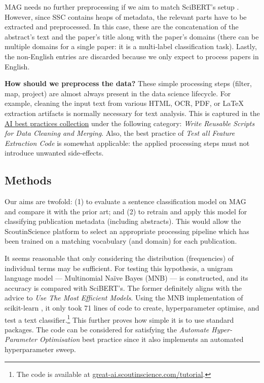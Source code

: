 MAG needs no further preprocessing if we aim to match SciBERT's setup \cite{beltagy2019scibert}. However, since SSC contains heaps of metadata, the relevant parts have to be extracted and preprocessed. In this case, these are the concatenation of the abstract's text and the paper's title along with the paper's domains (there can be multiple domains for a single paper: it is a multi-label classification task). Lastly, the non-English entries are discarded because we only expect to process papers in English.

\begin{displayquote}
\textbf{How should we preprocess the data?} These simple processing steps (filter, map, project) are almost always present in the data science lifecycle. For example, cleaning the input text from various HTML, OCR, PDF, or \LaTeX \hskip 0.12cm extraction artifacts is normally necessary for text analysis. This is captured in the \href{https://se-ml.github.io/practices}{AI best practices collection} under the following category: \textit{Write Reusable Scripts for Data Cleaning and Merging}. Also, the best practice of \textit{Test all Feature Extraction Code} is somewhat applicable: the applied processing steps must not introduce unwanted side-effects.
\end{displayquote}

\subsection{Methods}

Our aims are twofold: (1) to evaluate a sentence classification model on MAG and compare it with the prior art; and (2) to retrain and apply this model for classifying publication metadata (including abstracts). This would allow the ScoutinScience platform to select an appropriate processing pipeline which has been trained on a matching vocabulary (and domain) for each publication. 

It seems reasonable that only considering the distribution (frequencies) of individual terms may be sufficient. For testing this hypothesis, a unigram language model --- Multinomial Naïve Bayes (MNB) --- is constructed, and its accuracy is compared with SciBERT's. The former definitely aligns with the advice to \textit{Use The Most Efficient Models}. Using the MNB implementation of scikit-learn \cite{pedregosa2011scikit}, it only took 71 lines of code to create, hyperparameter optimise, and test a text classifier.\footnote{The code is available at \href{https://great-ai.scoutinscience.com/tutorial/}{great-ai.scoutinscience.com/tutorial}.} This further proves how simple it is to use standard packages. The code can be considered for satisfying the \textit{Automate Hyper-Parameter Optimisation} best practice since it also implements an automated hyperparameter sweep. 

